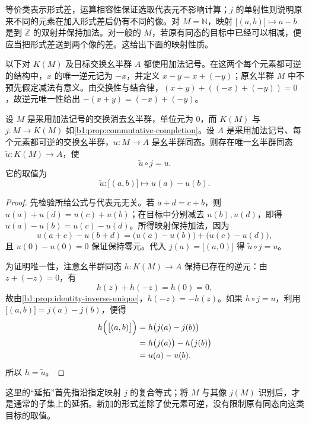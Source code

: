 等价类表示形式差，运算相容性保证选取代表元不影响计算；\(j\) 的单射性则说明原来不同的元素在加入形式差后仍有不同的像。对 \(M=\mathbb N\)，映射 \(\bigl[(a,b)\bigr]\mapsto a-b\) 是到 \(\mathbb Z\) 的双射并保持加法。对一般的 \(M\)，若原有同态的目标中已经可以相减，便应当把形式差送到两个像的差。这给出下面的映射性质。

\ProseParagraphBreak
以下对 \(K(M)\) 及目标交换幺半群 \(A\) 都使用加法记号。在这两个每个元素都可逆的结构中，\(x\) 的唯一逆元记为 \(-x\)，并定义 \(x-y=x+(-y)\)；原幺半群 \(M\) 中不预先假定减法有意义。由交换性与结合律，\((x+y)+((-x)+(-y))=0\)，故逆元唯一性给出 \(-(x+y)=(-x)+(-y)\)。

\begin{proposition}[群化的映射性质]\label{b1:prop:group-completion-universal}
	设 \(M\) 是采用加法记号的交换消去幺半群，单位元为 \(0\)，而 \(K(M)\) 与 \(j:M\rightarrow K(M)\) 如\cref{b1:prop:commutative-completion}。设 \(A\) 是采用加法记号、每个元素都可逆的交换幺半群，\(u:M\rightarrow A\) 是幺半群同态。则存在唯一幺半群同态 \(\widetilde u:K(M)\rightarrow A\)，使
	\[
		\widetilde u\circ j=u.
	\]
	它的取值为
	\[
		\widetilde u:\bigl[(a,b)\bigr]\longmapsto u(a)-u(b).
	\]
\end{proposition}

\begin{proof}
	先检验所给公式与代表元无关。若 \(a+d=c+b\)，则 \(u(a)+u(d)=u(c)+u(b)\)；在目标中分别减去 \(u(b),u(d)\)，即得 \(u(a)-u(b)=u(c)-u(d)\)。所得映射保持加法，因为
	\[
		u(a+c)-u(b+d) =\bigl(u(a)-u(b)\bigr)+\bigl(u(c)-u(d)\bigr),
	\]
	且 \(u(0)-u(0)=0\) 保证保持零元。代入 \(j(a)=\bigl[(a,0)\bigr]\) 得 \(\widetilde u\circ j=u\)。

	为证明唯一性，注意幺半群同态 \(h:K(M)\rightarrow A\) 保持已存在的逆元：由 \(z+(-z)=0\)，有
	\[
		h(z)+h(-z)=h(0)=0,
	\]
	故由\cref{b1:prop:identity-inverse-unique}，\(h(-z)=-h(z)\)。如果 \(h\circ j=u\)，利用 \(\bigl[(a,b)\bigr]=j(a)-j(b)\)，便得
	\[
		\begin{aligned}
			h\Bigl(\bigl[(a,b)\bigr]\Bigr) &=h\bigl(j(a)-j(b)\bigr)\\
			&=h\bigl(j(a)\bigr)-h\bigl(j(b)\bigr)\\
			&=u(a)-u(b).
		\end{aligned}
	\]
	所以 \(h=\widetilde u\)。
\end{proof}

这里的“延拓”首先指沿指定映射 \(j\) 的复合等式；将 \(M\) 与其像 \(j(M)\) 识别后，才是通常的子集上的延拓。新加的形式差除了使元素可逆，没有限制原有同态向这类目标的取值。

